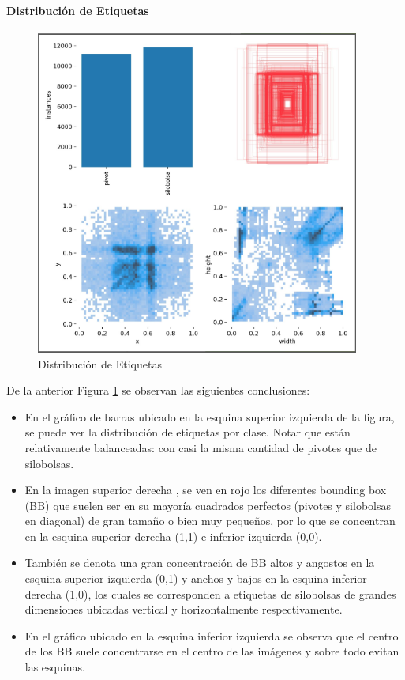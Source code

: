 \paragraph{Distribución de Etiquetas}
\begin{figure}[h!]
    \centering
    \includegraphics[width=0.95\textwidth]{img/distribucion de etiquetas.png}
    \caption{Distribución de Etiquetas}
    \label{fig:distribucion de etiquetas}
\end{figure}

De la anterior Figura \ref{fig:distribucion de etiquetas} se observan las siguientes conclusiones:
\begin{itemize}
    \item En el gráfico de barras ubicado en la esquina superior izquierda de la figura, se puede ver la distribución de etiquetas por clase. Notar que están relativamente balanceadas: con casi la misma cantidad de pivotes que de silobolsas.
    \item En la imagen superior derecha , se ven en rojo los diferentes bounding box (BB) que suelen ser en su mayoría cuadrados perfectos (pivotes y silobolsas en diagonal) de gran tamaño o bien muy pequeños, por lo que se concentran en la esquina superior derecha (1,1) e inferior izquierda (0,0).
    \item También se denota una gran concentración de BB altos y angostos  en la esquina superior izquierda (0,1) y anchos y bajos en la esquina inferior derecha (1,0), los cuales se corresponden a etiquetas de silobolsas de grandes dimensiones ubicadas vertical y horizontalmente respectivamente.
    \item En el gráfico ubicado en la esquina inferior izquierda se observa que el centro de los BB suele concentrarse en el centro de las imágenes y sobre todo evitan las esquinas.
\end{itemize}

